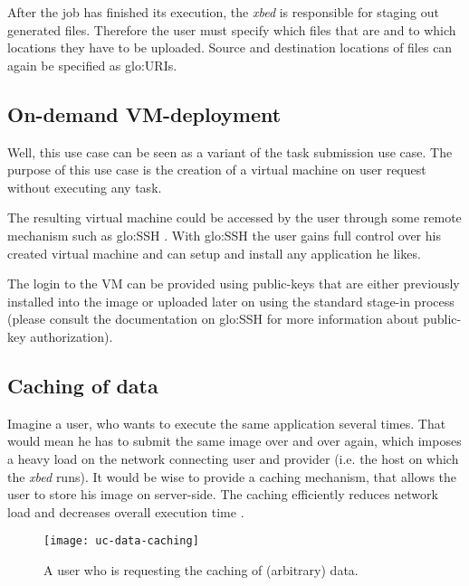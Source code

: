 After the job  has finished its execution, the  \emph{xbed} is responsible
for staging  out generated  files. Therefore the  user must  specify which
files that are and to which locations they have to be uploaded. Source and
destination locations of files can again be specified as \gls{glo:URI}s.

\subsection{On-demand VM-deployment}
\label{sec:uc-on-demand-vm-deployment}

Well, this use  case can be seen  as a variant of the  task submission use
case. The purpose of this use case is the creation of a virtual machine on
user request without executing any task.

The resulting virtual  machine could be accessed by  the user through some
remote mechanism such as \gls{glo:SSH} \cite{openssh}.  With \gls{glo:SSH}
the user gains full control over his created virtual machine and can setup
and install any application he likes.

The login  to the  VM can  be provided using  public-keys that  are either
previously  installed  into the  image  or  uploaded  later on  using  the
standard   stage-in   process  (please   consult   the  documentation   on
\gls{glo:SSH} for more information about public-key authorization).


\subsection{Caching of data}
\label{sec:uc-data-caching}

Imagine a user,  who wants to execute the  same application several times.
That would mean he has to submit the same image over and over again, which
imposes a heavy load on the network connecting user and provider (i.e. the
host on which the \emph{xbed} runs). It would be wise to provide a caching
mechanism, that  allows the  user to store  his image on  server-side. The
caching efficiently  reduces network load and  decreases overall execution
time \cite{locality-principle}.

\begin{figure}[h]
  \centering
  \texttt{[image: uc-data-caching]}
  \caption[UC  Data  Caching]{A user  who  is  requesting  the caching  of
    (arbitrary) data.}
  \label{fig:uc-data-caching}
\end{figure}

